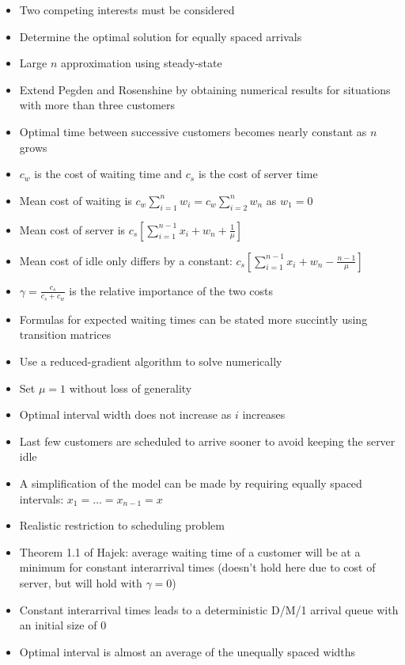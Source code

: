 \documentclass{article}
\begin{document}
\begin{itemize}
	\item Two competing interests must be considered
    \item Determine the optimal solution for equally spaced arrivals
    \item Large $n$ approximation using steady-state
    \item Extend Pegden and Rosenshine by obtaining numerical results for situations with more than three customers
    \item Optimal time between successive customers becomes nearly constant as $n$ grows
    \item $c_{w}$ is the cost of waiting time and $c_{s}$ is the cost of server time
    \item Mean cost of waiting is $c_{w} \sum_{i = 1}^{n} w_{i} = c_{w} \sum_{i = 2}^{n} w_{n}$ as $w_{1} = 0$
    \item Mean cost of server is $c_{s} \left[ \sum_{i = 1}^{n - 1} x_{i} + w_{n} + \frac{1}{\mu} \right]$
    \item Mean cost of idle only differs by a constant: $c_{s} \left[ \sum_{i = 1}^{n - 1} x_{i} + w_{n} - \frac{n - 1}{\mu} \right]$
    \item $\gamma = \frac{c_{s}}{c_{s} + c_{w}}$ is the relative importance of the two costs
    \item Formulas for expected waiting times can be stated more succintly using transition matrices
    \item Use a reduced-gradient algorithm to solve numerically
    \item Set $\mu = 1$ without loss of generality
    \item Optimal interval width does not increase as $i$ increases
    \item Last few customers are scheduled to arrive sooner to avoid keeping the server idle
    \item A simplification of the model can be made by requiring equally spaced intervals: $x_{1} = \ldots = x_{n - 1} = x$
    \item Realistic restriction to scheduling problem
    \item Theorem 1.1 of Hajek: average waiting time of a customer will be at a minimum for constant interarrival times (doesn't hold here due to cost of server, but will hold with $\gamma = 0$)
    \item Constant interarrival times leads to a deterministic D/M/1 arrival queue with an initial size of 0
    \item Optimal interval is almost an average of the unequally spaced widths

\end{itemize}
\end{document}
